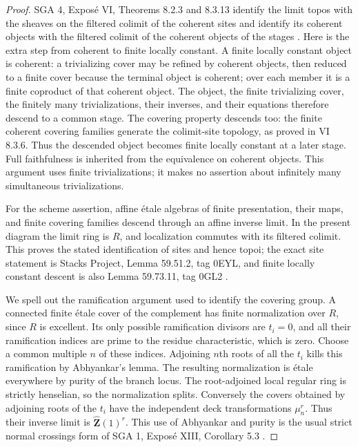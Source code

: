 \begin{proof}
SGA 4, Expos\'e VI, Theorems 8.2.3 and 8.3.13 identify the limit topos
with the sheaves on the filtered colimit of the coherent sites and
identify its coherent objects with the filtered colimit of the coherent
objects of the stages \cite{fghSGA4}. Here is the extra step from coherent
to finite locally constant. A finite locally constant object is coherent:
a trivializing cover may be refined by coherent objects, then reduced to
a finite cover because the terminal object is coherent; over each member
it is a finite coproduct of that coherent object. The object, the finite
trivializing cover, the finitely many trivializations, their inverses,
and their equations therefore descend to a common stage. The covering
property descends too: the finite coherent covering families generate
the colimit-site topology, as proved in VI 8.3.6. Thus the descended
object becomes finite locally constant at a later stage. Full faithfulness
is inherited from the equivalence on coherent objects. This argument
uses finite trivializations; it makes no assertion about infinitely many
simultaneous trivializations.

For the scheme assertion, affine \'etale algebras of finite presentation,
their maps, and finite covering families descend through an affine
inverse limit. In the present diagram the limit ring is $R$, and
localization commutes with its filtered colimit. This proves the stated
identification of sites and hence topoi; the exact site statement is
Stacks Project, Lemma 59.51.2, tag 0EYL, and finite locally constant
descent is also Lemma 59.73.11, tag 0GL2 \cite{fghStacksLimits}.

We spell out the ramification argument used to identify the covering
group. A connected finite \'etale cover of the complement has finite
normalization over $R$, since $R$ is excellent. Its only possible
ramification divisors are $t_i=0$, and all their ramification indices
are prime to the residue characteristic, which is zero. Choose a common
multiple $n$ of these indices. Adjoining $n$th roots of all the $t_i$
kills this ramification by Abhyankar's lemma. The resulting normalization
is \'etale everywhere by purity of the branch locus. The root-adjoined
local regular ring is strictly henselian, so the normalization splits.
Conversely the covers obtained by adjoining roots of the $t_i$ have the
independent deck transformations $\mu_n^r$. Thus their inverse limit is
$\widehat{\mathbf Z}(1)^r$. This use of Abhyankar and purity is the usual
strict normal crossings form of SGA 1, Expos\'e XIII, Corollary 5.3
\cite{fghSGA1}.


\end{proof}

